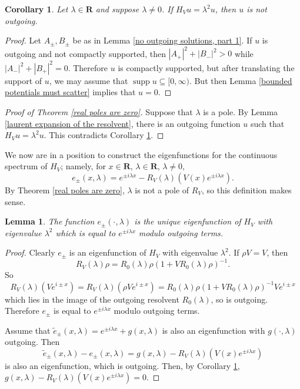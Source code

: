 \documentclass[12pt]{report}
\newcommand{\RR}{\mathbf{R}}
\DeclareMathOperator{\supp}{supp}
\newtheorem{lemma}[theorem]{Lemma}
\newtheorem{corollary}[theorem]{Corollary}
\theoremstyle{definition}
\begin{document}
\begin{corollary}
\label{no outgoing solutions, part 2}
Let $\lambda \in \RR$ and suppose $\lambda \neq 0$. If $H_Vu = \lambda^2u$, then $u$ is not outgoing.
\end{corollary}
\begin{proof}
Let $A_\pm,B_\pm$ be as in Lemma \ref{no outgoing solutions, part 1}. If $u$ is outgoing and not compactly supported, then $|A_+|^2 + |B_-|^2 > 0$ while $|A_-|^2 + |B_+|^2 = 0$. Therefore $u$ is compactly supported, but after translating the support of $u$, we may assume that $\supp u \subseteq [0, \infty)$. But then Lemma \ref{bounded potentials must scatter} implies that $u = 0$.
\end{proof}

\begin{proof}[Proof of Theorem \ref{real poles are zero}]
Suppose that $\lambda$ is a pole. By Lemma \ref{laurent expansion of the resolvent}, there is an outgoing function $u$ such that $H_Vu = \lambda^2u$. This contradicts Corollary \ref{no outgoing solutions, part 2}.
\end{proof}

We now are in a position to construct the eigenfunctions for the continuous spectrum of $H_V$; namely, for $x \in \RR$, $\lambda \in \RR$, $\lambda \neq 0$,
$$e_\pm(x, \lambda) = e^{\pm i\lambda x} - R_V(\lambda)(V(x)e^{\pm i\lambda x}).$$
By Theorem \ref{real poles are zero}, $\lambda$ is not a pole of $R_V$, so this definition makes sense.
\begin{lemma}
The function $e_\pm(\cdot, \lambda)$ is the unique eigenfunction of $H_V$ with eigenvalue $\lambda^2$ which is equal to $e^{\pm i\lambda x}$ modulo outgoing terms.
\end{lemma}
\begin{proof}
Clearly $e_\pm$ is an eigenfunction of $H_V$ with eigenvalue $\lambda^2$. If $\rho V = V$, then
$$R_V(\lambda)\rho = R_0(\lambda)\rho(1 + VR_0(\lambda)\rho)^{-1}.$$
So
$$R_V(\lambda)(Ve^{i\pm x}) = R_V(\lambda)(\rho Ve^{i\pm x}) = R_0(\lambda)\rho(1 + VR_0(\lambda)\rho)^{-1} Ve^{i\pm x}$$
which lies in the image of the outgoing resolvent $R_0(\lambda)$, so is outgoing. Therefore $e_\pm$ is equal to $e^{\pm i\lambda x}$ modulo outgoing terms.

Assume that $\tilde e_\pm(x, \lambda) = e^{\pm i\lambda x} + g(x, \lambda)$ is also an eigenfunction with $g(\cdot, \lambda)$ outgoing. Then
$$\tilde e_\pm(x, \lambda) - e_\pm(x, \lambda) = g(x, \lambda) - R_V(\lambda)(V(x)e^{\pm i\lambda x})$$
is also an eigenfunction, which is outgoing. Then, by Corollary \ref{no outgoing solutions, part 2}, $g(x, \lambda) - R_V(\lambda)(V(x)e^{\pm i\lambda x}) = 0$.
\end{proof}
\end{document}
